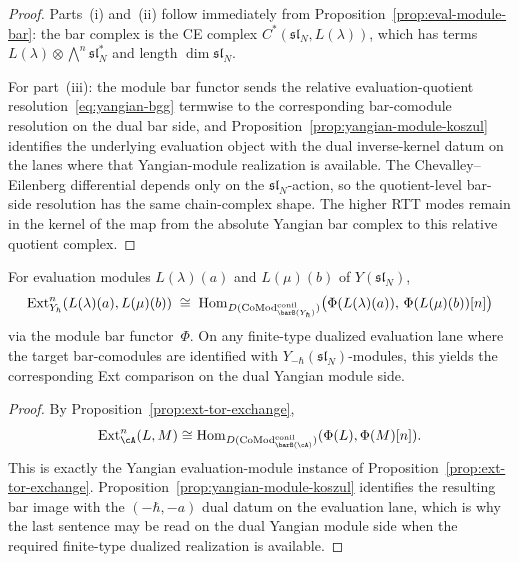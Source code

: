 \begin{proof}
Parts~(i) and~(ii) follow immediately from
Proposition~\ref{prop:eval-module-bar}: the bar complex
is the CE complex $C^*(\mathfrak{sl}_N, L(\lambda))$,
which has terms $L(\lambda) \otimes \bigwedge^n \mathfrak{sl}_N^*$
and length $\dim \mathfrak{sl}_N$.

For part~(iii): the module bar functor sends the relative
evaluation-quotient resolution~\eqref{eq:yangian-bgg} termwise to the
corresponding bar-comodule resolution on the dual bar side, and
Proposition~\ref{prop:yangian-module-koszul} identifies the
underlying evaluation object with the dual inverse-kernel datum on the
lanes where that Yangian-module realization is available. The
Chevalley--Eilenberg differential depends only on the
$\mathfrak{sl}_N$-action, so the quotient-level bar-side resolution has
the same chain-complex shape. The higher RTT modes remain in the
kernel of the map from the absolute Yangian bar complex to this
relative quotient complex.
\end{proof}

\begin{corollary}
\label{cor:yangian-ext-exchange}
For evaluation modules $L(\lambda)(a)$ and $L(\mu)(b)$
of $Y(\mathfrak{sl}_N)$,
\[
\operatorname{Ext}^n_{Y_\hbar}(L(\lambda)(a), L(\mu)(b))
\;\cong\;
\operatorname{Hom}_{D(\operatorname{CoMod}^{\mathrm{conil}}_{\barB(Y_\hbar)})}
\bigl(
 \Phi(L(\lambda)(a)),\,
 \Phi(L(\mu)(b))[n]
\bigr)
\]
via the module bar functor~$\Phi$. On any finite-type dualized
evaluation lane where the target bar-comodules are identified with
$Y_{-\hbar}(\mathfrak{sl}_N)$-modules, this yields the corresponding
Ext comparison on the dual Yangian module side.
\end{corollary}

\begin{proof}
By Proposition~\ref{prop:ext-tor-exchange},
\[
\operatorname{Ext}^n_{\cA}(L, M)
\cong
\operatorname{Hom}_{D(\operatorname{CoMod}^{\mathrm{conil}}_{\barB(\cA)})}
(\Phi(L), \Phi(M)[n]).
\]
This is exactly the Yangian evaluation-module instance of
Proposition~\ref{prop:ext-tor-exchange}. Proposition~\ref{prop:yangian-module-koszul}
identifies the resulting bar image with the $(-\hbar,-a)$ dual datum
on the evaluation lane, which is why the last sentence may be read on
the dual Yangian module side when the required finite-type dualized
realization is available.
\end{proof}

